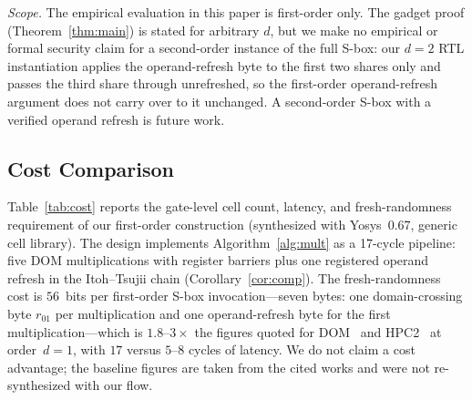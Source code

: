 \documentclass[lettersize,journal]{IEEEtran}
\begin{document}
\textit{Scope.}  The empirical evaluation in this paper is first-order
only.  The gadget proof (Theorem~\ref{thm:main}) is stated for
arbitrary $d$, but we make no empirical or formal security claim for a
second-order instance of the full S-box: our $d{=}2$ RTL instantiation
applies the operand-refresh byte to the first two shares only and passes
the third share through unrefreshed, so the first-order operand-refresh
argument does not carry over to it unchanged.  A second-order S-box with
a verified operand refresh is future work.

\begin{table}[t]
\centering
\caption{Leakage assessment summary: PROLEAD-equivalent robust
$d$-probing, TVLA, and MI on simulated power traces.
``First $\max|t|{>}4.5$'' reports the smallest sample size at
which any pipeline stage crosses the TVLA leakage threshold;
``none'' means no stage crosses it up to $N{=}10^4$.  Only the first-order design is evaluated (\S\ref{sec:partial-d2}).}
\label{tab:leakage}

\end{table}

\subsection{Cost Comparison}
\label{sec:cost}
Table~\ref{tab:cost} reports the gate-level cell count, latency, and
fresh-randomness requirement of our first-order construction
(synthesized with Yosys~0.67, generic cell library).  The design
implements Algorithm~\ref{alg:mult} as a 17-cycle pipeline: five DOM
multiplications with register barriers plus one registered operand
refresh in the Itoh--Tsujii chain
(Corollary~\ref{cor:comp}).  The fresh-randomness cost is $56$~bits
per first-order S-box invocation---seven bytes: one domain-crossing
byte $r_{01}$ per multiplication and one operand-refresh byte for the
first multiplication---which
is $1.8$--$3\times$ the figures quoted for
DOM~\cite{gross2016dom} and HPC2~\cite{cassiers2020hpc} at
order~$d{=}1$, with $17$ versus $5$--$8$ cycles of latency.  We do not
claim a cost advantage; the baseline figures are taken from the cited
works and were not re-synthesized with our flow.
\end{document}
